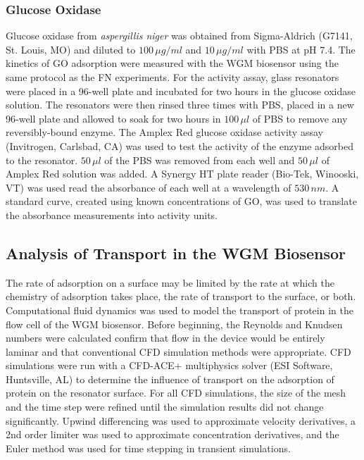 \subsubsection{Glucose Oxidase}

Glucose oxidase from \emph{aspergillis niger} was obtained from Sigma-Aldrich
(G7141, St. Louis, MO) and diluted to $100\,\mu g/ml$ and $10\,\mu g/ml$
with PBS at pH 7.4. The kinetics of GO adsorption were measured with
the WGM biosensor using the same protocol as the FN experiments. For
the activity assay, glass resonators were placed in a 96-well plate
and incubated for two hours in the glucose oxidase solution. The resonators
were then rinsed three times with PBS, placed in a new 96-well plate
and allowed to soak for two hours in $100\,\mu l$ of PBS to remove
any reversibly-bound enzyme. The Amplex Red glucose oxidase activity
assay (Invitrogen, Carlsbad, CA) was used to test the activity of
the enzyme adsorbed to the resonator. $50\,\mu l$ of the PBS was
removed from each well and $50\,\mu l$ of Amplex Red solution was
added. A Synergy HT plate reader (Bio-Tek, Winooski, VT) was used
read the absorbance of each well at a wavelength of $530\, nm$. A
standard curve, created using known concentrations of GO, was used
to translate the absorbance measurements into activity units.


\subsection{Analysis of Transport in the WGM Biosensor}

The rate of adsorption on a surface may be limited by the rate at
which the chemistry of adsorption takes place, the rate of transport
to the surface, or both. Computational fluid dynamics was used to
model the transport of protein in the flow cell of the WGM biosensor.
Before beginning, the Reynolds and Knudsen numbers were calculated
confirm that flow in the device would be entirely laminar and that
conventional CFD simulation methods were appropriate. CFD simulations
were run with a CFD-ACE+ multiphysics solver (ESI Software, Huntsville,
AL) to determine the influence of transport on the adsorption of protein
on the resonator surface. For all CFD simulations, the size of the
mesh and the time step were refined until the simulation results did
not change significantly. Upwind differencing was used to approximate
velocity derivatives, a 2nd order limiter was used to approximate
concentration derivatives, and the Euler method was used for time
stepping in transient simulations. 

